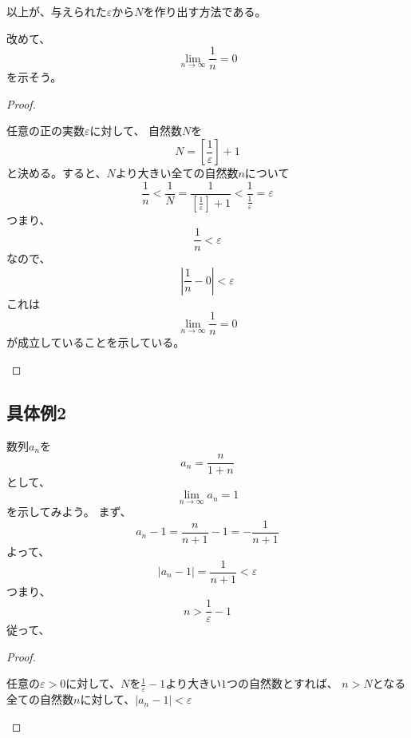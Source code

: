 \documentclass[a4paper,16pt]{jsarticle}
\newtheorem{proof}{証明}
\begin{document}
{以上が、与えられた$\varepsilon$から$N$を作り出す方法である。

改めて、
\begin{equation}
	\lim_{n\to\infty} \dfrac{1}{n} = 0
\end{equation}
を示そう。
\begin{proof}
	\begin{oframed}
		任意の正の実数$\varepsilon$に対して、
		自然数$N$を
		\begin{equation}
			N = \left[\dfrac{1}{\varepsilon}\right] + 1
		\end{equation}
		と決める。すると、$N$より大きい全ての自然数$n$について
		\begin{equation}
			\dfrac{1}{n} < \dfrac{1}{N} = \dfrac{1}{[\frac{1}{\varepsilon}] + 1} < \dfrac{1}{\frac{1}{\varepsilon}} = \varepsilon
		\end{equation}
		つまり、
		\begin{equation}
			\dfrac{1}{n} < \varepsilon
		\end{equation}
		なので、
		\begin{equation}
			\left|\dfrac{1}{n} - 0\right| < \varepsilon
		\end{equation}
		これは
		\begin{equation}
			\lim_{n\to\infty} \dfrac{1}{n} = 0
		\end{equation}
		が成立していることを示している。
	\end{oframed}
\end{proof}

\subsection{具体例2}
数列$a_n$を
\begin{equation}
	a_n = \dfrac{n}{1+n}
\end{equation}
として、
\begin{equation}
	\lim_{n \to \infty} a_n = 1
\end{equation}
を示してみよう。
まず、
\begin{equation}
	a_n - 1 = \dfrac{n}{n+1} - 1 = - \dfrac{1}{n+1}
\end{equation}
よって、
\begin{equation}
	|a_n - 1| = \dfrac{1}{n+1} < \varepsilon
\end{equation}
つまり、
\begin{equation}
	n > \dfrac{1}{\varepsilon} - 1
\end{equation}
従って、
	\begin{proof}
	\begin{oframed}
		任意の$\varepsilon>0$に対して、$N$を$\frac{1}{\varepsilon} - 1$より大きい$1$つの自然数とすれば、
		$n > N$となる全ての自然数$n$に対して、$|a_n - 1| < \varepsilon$
	\end{oframed}
\end{proof}

}
\end{document}
